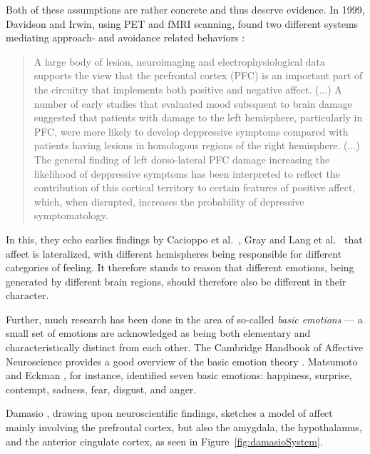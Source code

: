 \documentclass[]{scrartcl}
\theoremstyle{break}
\begin{document}
Both of these assumptions are rather concrete and thus deserve evidence. In 1999, Davidson and Irwin, using PET and fMRI scanning, found two different systems mediating approach- and avoidance related behaviors \cite[p. 13]{davidson1999}:

\begin{quote}
A large body of lesion, neuroimaging and electrophysiological data supports the view that the prefrontal cortex (PFC) is an important part of the circuitry that implements both positive and negative affect. ($\dots$)
A number of early studies that evaluated mood subsquent to brain damage suggested that patients with damage to the left hemisphere, particularly in PFC, were more likely to develop deppressive symptoms compared with patients having lesions in homologous regions of the right hemisphere. ($\dots$)
The general finding of left dorso-lateral PFC damage increasing the likelihood of deppressive symptoms has been interpreted to reflect the contribution of this cortical territory to certain features of positive affect, which, when disrupted, increases the probability of depressive symptomatology.
\end{quote}

In this, they echo earlies findings by Cacioppo et al.\ \cite{cacioppo1999}, Gray \cite{gray1994} and Lang et al.\ \cite{lang1990} that affect is lateralized, with different hemispheres being responsible for different categories of feeling. It therefore stands to reason that different emotions, being generated by different brain regions, should therefore also be different in their character.

Further, much research has been done in the area of so-called {\em basic emotions} --- a small set of emotions are acknowledged as being both elementary and characteristically distinct from each other. The Cambridge Handbook of Affective Neuroscience provides a good overview of the basic emotion theory \cite[pp. 9-10]{cambridgeAff}. Matsumoto and Eckman \cite{matsumoto2009}, for instance, identified seven basic emotions: happiness, surprise, contempt, sadness, fear, disgust, and anger.

Damasio \cite{damasio1998}, drawing upon neuroscientific findings, sketches a model of affect mainly involving the prefrontal cortex, but also the amygdala, the hypothalamus, and the anterior cingulate cortex, as seen in Figure~\ref{fig:damasioSystem}.
\end{document}
